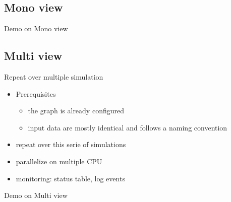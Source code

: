 \subsection{Mono view}

\begin{frame}{Demo on Mono view}
  \centering
\end{frame}


\subsection{Multi view}

\begin{frame}{Repeat over multiple simulation}
  \begin{itemize}
    \item Prerequisites
    \begin{itemize}
      \item the graph is already configured
      \item input data are mostly identical and follows a naming convention
    \end{itemize}
    \item repeat over this serie of simulations
    \item parallelize on multiple CPU
    \item monitoring: status table, log events
  \end{itemize}
\end{frame}

\begin{frame}{Demo on Multi view}
  \centering
\end{frame}
